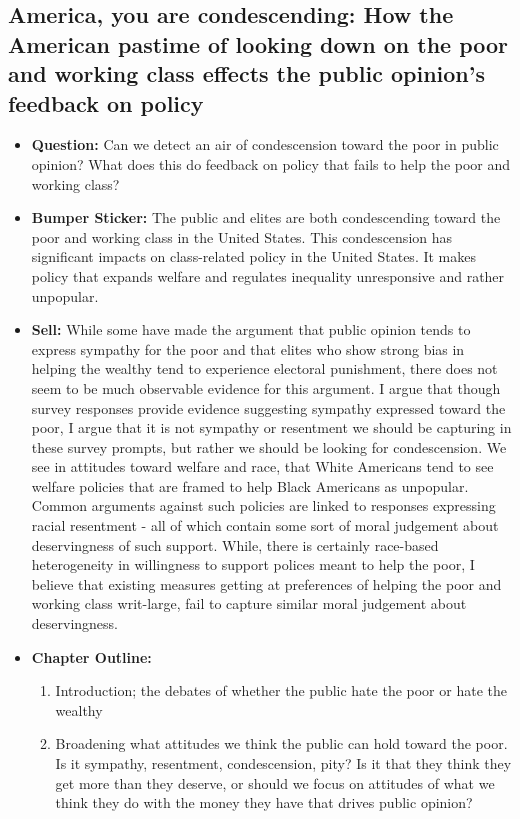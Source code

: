 \documentclass[12pt]{article}
\begin{document}
\subsection{America, you are condescending: How the American pastime of looking down on the poor and working class effects the public opinion's feedback on policy}
    \begin{itemize}
        \item \textbf{Question:} Can we detect an air of condescension toward the poor in public opinion? What does this do feedback on policy that fails to help the poor and working class?
        \item \textbf{Bumper Sticker:} The public and elites are both condescending toward the poor and working class in the United States. This condescension has significant impacts on class-related policy in the United States. It makes policy that expands welfare and regulates inequality unresponsive and rather unpopular.
        \item \textbf{Sell:} While some have made the argument that public opinion tends to express sympathy for the poor and that elites who show strong bias in helping the wealthy tend to experience electoral punishment, there does not seem to be much observable evidence for this argument. I argue that though survey responses provide evidence suggesting sympathy expressed toward the poor, I argue that it is not sympathy or resentment we should be capturing in these survey prompts, but rather we should be looking for condescension. We see in attitudes toward welfare and race, that White Americans tend to see welfare policies that are framed to help Black Americans as unpopular. Common arguments against such policies are linked to responses expressing racial resentment - all of which contain some sort of moral judgement about deservingness of such support. While, there is certainly race-based heterogeneity in willingness to support polices meant to help the poor, I believe that existing measures getting at preferences of helping the poor and working class writ-large, fail to capture similar moral judgement about deservingness. 
        \item \textbf{Chapter Outline:}
        \begin{enumerate}
            \item Introduction; the debates of whether the public hate the poor or hate the wealthy
            \item Broadening what attitudes we think the public can hold toward the poor. Is it sympathy, resentment, condescension, pity? Is it that they think they get more than they deserve, or should we focus on attitudes of what we think they do with the money they have that drives public opinion?

\end{enumerate}
\end{itemize}
\end{document}
